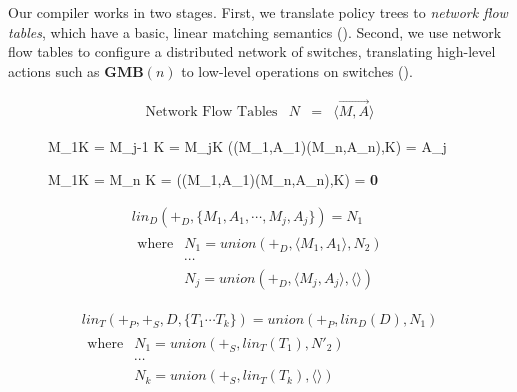 Our compiler works in two stages. First, we translate policy trees to
\emph{network flow tables}, which have a basic,
linear matching semantics (). Second, we use
network flow tables to configure a distributed network of switches,
translating high-level actions such as $\textbf{GMB}(n)$ to low-level
operations on switches ().

\begin{figure}[t]

\begin{displaymath}
\begin{array}{lrcl}
\textrm{Network Flow Tables} & N & = & \langle \overrightarrow{M,A} \rangle
\end{array}
\end{displaymath}


\medskip

\inference
{M_1\cap K = \emptyset \cdots M_{j-1} \cap K = \emptyset \qquad
 M_j\cap K \ne \emptyset }
{(\langle(M_1,A_1)\cdots(M_n,A_n)\rangle,K) = A_j}

\medskip

\inference
{M_1\cap K = \emptyset \cdots M_{n} \cap K = \emptyset}
{(\langle(M_1,A_1)\cdots(M_n,A_n)\rangle,K) = \textbf{0}}


\medskip

\begin{displaymath}
\begin{array}{l}
\mathit{lin}_D\left(+_D,\{M_1,A_1, \cdots, M_j,A_j \}\right) 
  = N_1 \\
\begin{array}{lllll}
\textrm{where} 
& N_1 = \mathit{union}(+_D,\langle M_1,A_1\rangle, N_2) \\
& \cdots \\
& N_j = \mathit{union}(+_D, \langle M_j,A_j\rangle, \langle\rangle)
\end{array}
\end{array}
\end{displaymath}

\begin{displaymath}
\begin{array}{l}
\mathit{lin}_T\left(+_P,+_S,D, \{T_1\cdots T_k\}\right)
  = \mathit{union}(+_P,\mathit{lin}_D(D), N_1) \\
\begin{array}{lllll}
\textrm{where} 
& N_1 = \mathit{union}(+_S, \mathit{lin}_T(T_1), N'_2) \\
& \cdots \\
& N_k = \mathit{union}(+_S,\mathit{lin}_T(T_k), \langle \rangle)
\end{array}
\end{array}
\end{displaymath}


\end{figure}
